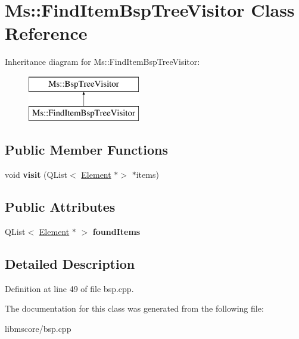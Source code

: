 \hypertarget{class_ms_1_1_find_item_bsp_tree_visitor}{}\section{Ms\+:\+:Find\+Item\+Bsp\+Tree\+Visitor Class Reference}
\label{class_ms_1_1_find_item_bsp_tree_visitor}
Inheritance diagram for Ms\+:\+:Find\+Item\+Bsp\+Tree\+Visitor\+:\begin{figure}[H]
\begin{center}
\leavevmode
\includegraphics[height=2.000000cm]{class_ms_1_1_find_item_bsp_tree_visitor}
\end{center}
\end{figure}
\subsection*{Public Member Functions}
\begin{DoxyCompactItemize}
\item 
\mbox{\label{class_ms_1_1_find_item_bsp_tree_visitor_a050a9a1979a8f3204eb2790fa5bbf802}} 
void {\bfseries visit} (Q\+List$<$ \hyperlink{class_ms_1_1_element}{Element} $\ast$$>$ $\ast$items)
\end{DoxyCompactItemize}
\subsection*{Public Attributes}
\begin{DoxyCompactItemize}
\item 
\mbox{\label{class_ms_1_1_find_item_bsp_tree_visitor_ad591793bc2968fac6b9ccae004c6dba8}} 
Q\+List$<$ \hyperlink{class_ms_1_1_element}{Element} $\ast$ $>$ {\bfseries found\+Items}
\end{DoxyCompactItemize}


\subsection{Detailed Description}


Definition at line 49 of file bsp.\+cpp.



The documentation for this class was generated from the following file\+:\begin{DoxyCompactItemize}
\item 
libmscore/bsp.\+cpp\end{DoxyCompactItemize}
